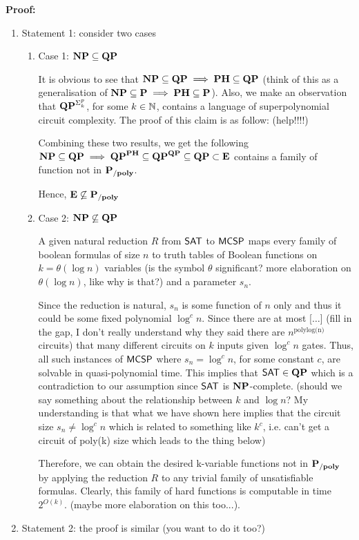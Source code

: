 \documentclass[12pt]{article}
\theoremstyle{definition}
\begin{document}
\textbf{Proof:}
\begin{enumerate}[-]
	\item Statement 1: consider two cases
	\begin{enumerate} [+]
		\item Case 1: $\mathbf{NP} \subseteq \mathbf{QP}$
		
		It is obvious to see that $\mathbf{NP} \subseteq \mathbf{QP} \implies \mathbf{PH} \subseteq \mathbf{QP}$ (think of this as a generalisation of $\mathbf{NP} \subseteq \mathbf{P} \implies \mathbf{PH} \subseteq \mathbf{P}$). Also, we make an observation that $\mathbf{QP}^{\Sigma_k^p}$, for some $k \in {\mathbb{N}}$, contains a language of superpolynomial circuit complexity. The proof of this claim is as follow: (help!!!!)
		
		Combining these two results, we get the following $\mathbf{NP} \subseteq \mathbf{QP} \implies \mathbf{QP}^{\mathbf{PH}} \subseteq \mathbf{QP}^{\mathbf{QP}} \subseteq \mathbf{QP} \subset \mathbf{E}$ contains a family of function not in $\mathbf{P_{/poly}}$. 
		
		Hence, $\mathbf{E} \not\subseteq \mathbf{P_{/poly}}$\\
		
		\item Case 2: $\mathbf{NP} \not\subseteq \mathbf{QP}$
		
		A given natural reduction $R$ from $\mathsf{SAT}$ to $\mathsf{MCSP}$ maps every family of boolean formulas of size $n$  to truth tables of Boolean functions on $k = \theta(\log n)$ variables (is the symbol $\theta$ significant? more elaboration on $\theta(\log n)$, like why is that?) and a parameter $s_n$.
		
		Since the reduction is natural, $s_n$ is some function of $n$ only and thus it could be some fixed polynomial $\log^c n$. Since there are at most [$\dots$] (fill in the gap, I don't really understand why they said there are $n^{\text{polylog(n)}}$ circuits) that many different circuits on $k$ inputs given $\log^c n$ gates. Thus, all such instances of $\mathsf{MCSP}$ where $s_n = \log^c n$, for some constant $c$, are solvable in quasi-polynomial time. This implies that $\mathsf{SAT} \in \mathbf{QP}$ which is a contradiction to our assumption since $\mathsf{SAT}$ is $\mathbf{NP}$-complete. (should we say something about the relationship between $k$ and $\log n$? My understanding is that what we have shown here implies that the circuit size $s_n \neq \log^c n$ which is related to something like $k^c$, i.e. can't get a circuit of poly(k) size which leads to the thing below)
		
		Therefore, we can obtain the desired k-variable functions not in $\mathbf{P_{/poly}}$ by applying the reduction $R$ to any trivial family of unsatisfiable formulas. Clearly, this family of hard functions is computable in time $2^{O(k)}$. (maybe more elaboration on this too...).
		
	\end{enumerate}
	\item Statement 2: the proof is similar (you want to do it too?)
\end{enumerate}
\end{document}
